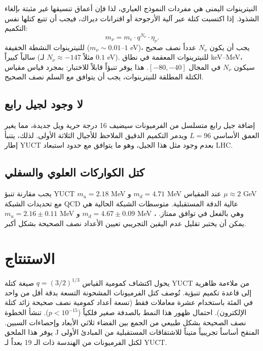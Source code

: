 \documentclass[12pt,a4paper]{article}
\begin{document}
	النيترينوات اليمنى هي مفردات النموذج العياري، لذا فإن أعماق تنسيقها غير مثبتة بإلغاء الشذوذ. إذا اكتسبت كتلة عبر آلية الأرجوحة أو اقترانات ديراك، فيجب أن تتبع كتلها نفس التكميم:
	\begin{equation}
		m_\nu = m_e \cdot q^{N_\nu} \cdot \eta_\nu.
	\end{equation}
	للنيترينوات النشطة الخفيفة (\(m_\nu \sim 0.01\)–\(1\) eV)، يجب أن يكون \(N_\nu\) عدداً نصف صحيح سالباً كبيراً (مثلاً \(N_\nu \approx -147\) لـ \(0.1\) eV). للنيترينوات المعقمة في نطاق keV–MeV، سيكون \(N_\nu\) في المجال \([-80, -40]\). هذا يوفر تنبؤاً قابلاً للاختبار: بمجرد قياس مقياس الكتلة المطلقة للنيترينوات، يجب أن يتوافق مع السلم نصف الصحيح.
	
	\subsection{لا وجود لجيل رابع}
	
	إضافة جيل رابع متسلسل من الفرميونات سيضيف 16 درجة حرية ويل جديدة، مما يغير العمق الأساسي \(L=96\) ويدمر التكميم الدقيق الملاحظ للأجيال الثلاثة الأولى. لذلك، يتنبأ إطار YUCT بعدم وجود مثل هذا الجيل، وهو ما يتوافق مع حدود استبعاد LHC.
	
	\subsection{كتل الكواركات العلوي والسفلي}
	
	يجب مقارنة تنبؤ YUCT \(m_u = 2.18\) MeV و \(m_d = 4.71\) MeV عند المقياس \(\mu \approx 2\) GeV مع تحديدات الشبكة QCD عالية الدقة المستقبلية. متوسطات الشبكة الحالية هي \(m_u = 2.16 \pm 0.11\) MeV و \(m_d = 4.67 \pm 0.09\) MeV \cite{PDG2024}، وهي بالفعل في توافق ممتاز. يمكن أن يختبر تقليل عدم اليقين التجريبي تعيين الأعداد نصف الصحيحة بشكل أكبر.
	
	\section{الاستنتاج}
	
	يحول اكتشاف كمومية القياس \(q = (3/2)^{1/3}\) صيغة كتلة YUCT من ملاءمة ظاهرية إلى قاعدة تكميم تنبؤية. تُوصف كتل الفرميونات المشحونة التسعة بدقة أقل من واحد في المئة باستخدام عشرة معاملات فقط (تسعة أعداد كمومية نصف صحيحة زائد كتلة الإلكترون). احتمال ظهور هذا النمط بالصدفة صغير فلكياً (\(p < 10^{-15}\)). تنشأ الخطوة نصف الصحيحة بشكل طبيعي من الجمع بين الفضاء ثلاثي الأبعاد وإحصاءات السبين. يوفر هذا الملحق J المنقح أساساً تجريبياً متيناً للاشتقاقات المستقبلية من المبادئ الأولى لكتل الفرميونات من الهندسة ذات الـ 19 بعداً لـ YUCT.
	
\end{document}
